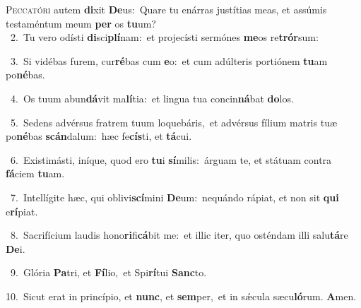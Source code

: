 \lettrine{\initial\textcolor{\initialcolor}{P}}{eccatóri} autem \textbf{di}\-xit \textbf{De}\-us:~\star Quare tu enárras justítias meas, et assúmis testaméntum meum \textbf{per} os \textbf{tu}\-um?\\
{\numbfont\textcolor{\numbcolor}{~2.}}~Tu vero odísti \textbf{di}\-sci\-\textbf{plí}\-nam:~\star et projecísti sermónes \textbf{me}\-os re\-\textbf{trór}\-sum:\par
{\numbfont\textcolor{\numbcolor}{~3.}}~Si vidébas furem, cur\-\textbf{ré}\-bas cum \textbf{e}\-o:~\star et cum adúlteris portiónem \textbf{tu}\-am po\-\textbf{né}\-bas.\par
{\numbfont\textcolor{\numbcolor}{~4.}}~Os tuum abun\-\textbf{dá}\-vit ma\-\textbf{lí}\-tia:~\star et lingua tua concin\-\textbf{ná}\-bat \textbf{do}\-los.\par
{\numbfont\textcolor{\numbcolor}{~5.}}~Sedens advérsus fratrem tuum loquebáris,~\dagger et advérsus fílium matris tuæ po\-\textbf{né}\-bas \textbf{scán}\-dalum:~\star hæc fe\-\textbf{cís}\-ti, et \textbf{tá}\-cui.\par
{\numbfont\textcolor{\numbcolor}{~6.}}~Existimásti, iníque, quod ero \textbf{tu}\-i \textbf{sí}\-milis:~\star árguam te, et státuam contra \textbf{fá}\-ciem \textbf{tu}\-am.\par
{\numbfont\textcolor{\numbcolor}{~7.}}~Intellígite hæc, qui oblivi\-\textbf{scí}\-mini \textbf{De}\-um:~\star nequándo rápiat, et non sit \textbf{qui} e\-\textbf{rí}\-piat.\par
{\numbfont\textcolor{\numbcolor}{~8.}}~Sacrifícium laudis hono\-\textbf{ri}\-fi\-\textbf{cá}\-bit me:~\star et illic iter, quo osténdam illi salu\-\textbf{tá}\-re \textbf{De}\-i.\par
{\numbfont\textcolor{\numbcolor}{~9.}}~Glória \textbf{Pa}\-tri, et \textbf{Fí}\-lio,~\star et Spi\-\textbf{rí}\-tui \textbf{Sanc}\-to.\par
{\numbfont\textcolor{\numbcolor}{10.}}~Sicut erat in princípio, et \textbf{nunc}\-, et \textbf{sem}\-per,~\star et in sǽcula sæcu\-\textbf{ló}\-rum. \textbf{A}\-men.\par
